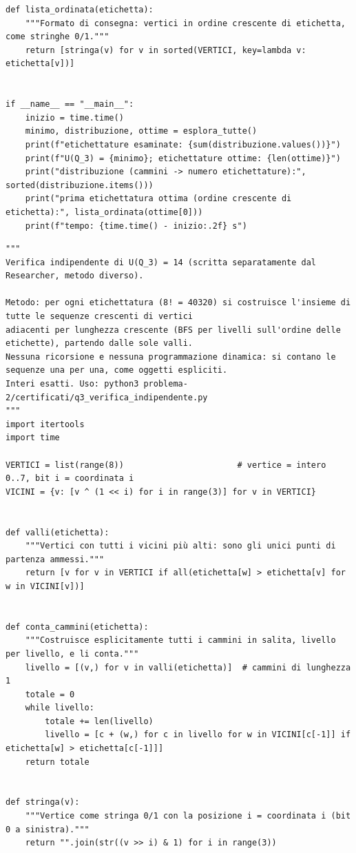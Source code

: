 \documentclass[11pt,a4paper]{article}
\begin{document}
\begin{lstlisting}[caption={certificati/q3\_esaustivo.py}]
def lista_ordinata(etichetta):
    """Formato di consegna: vertici in ordine crescente di etichetta, come stringhe 0/1."""
    return [stringa(v) for v in sorted(VERTICI, key=lambda v: etichetta[v])]


if __name__ == "__main__":
    inizio = time.time()
    minimo, distribuzione, ottime = esplora_tutte()
    print(f"etichettature esaminate: {sum(distribuzione.values())}")
    print(f"U(Q_3) = {minimo}; etichettature ottime: {len(ottime)}")
    print("distribuzione (cammini -> numero etichettature):", sorted(distribuzione.items()))
    print("prima etichettatura ottima (ordine crescente di etichetta):", lista_ordinata(ottime[0]))
    print(f"tempo: {time.time() - inizio:.2f} s")

\end{lstlisting}
\begin{lstlisting}[caption={certificati/q3\_verifica\_indipendente.py}]
"""
Verifica indipendente di U(Q_3) = 14 (scritta separatamente dal Researcher, metodo diverso).

Metodo: per ogni etichettatura (8! = 40320) si costruisce l'insieme di tutte le sequenze crescenti di vertici
adiacenti per lunghezza crescente (BFS per livelli sull'ordine delle etichette), partendo dalle sole valli.
Nessuna ricorsione e nessuna programmazione dinamica: si contano le sequenze una per una, come oggetti espliciti.
Interi esatti. Uso: python3 problema-2/certificati/q3_verifica_indipendente.py
"""
import itertools
import time

VERTICI = list(range(8))                       # vertice = intero 0..7, bit i = coordinata i
VICINI = {v: [v ^ (1 << i) for i in range(3)] for v in VERTICI}


def valli(etichetta):
    """Vertici con tutti i vicini più alti: sono gli unici punti di partenza ammessi."""
    return [v for v in VERTICI if all(etichetta[w] > etichetta[v] for w in VICINI[v])]


def conta_cammini(etichetta):
    """Costruisce esplicitamente tutti i cammini in salita, livello per livello, e li conta."""
    livello = [(v,) for v in valli(etichetta)]  # cammini di lunghezza 1
    totale = 0
    while livello:
        totale += len(livello)
        livello = [c + (w,) for c in livello for w in VICINI[c[-1]] if etichetta[w] > etichetta[c[-1]]]
    return totale


def stringa(v):
    """Vertice come stringa 0/1 con la posizione i = coordinata i (bit 0 a sinistra)."""
    return "".join(str((v >> i) & 1) for i in range(3))



\end{lstlisting}
\end{document}
